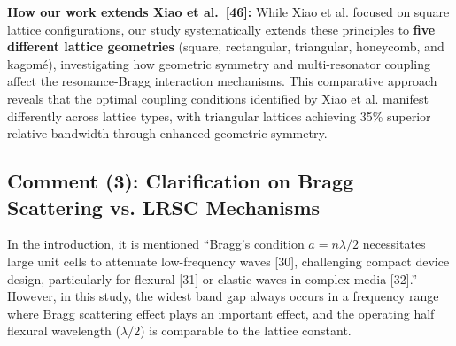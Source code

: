 \documentclass[11pt,a4paper]{article}
\newenvironment{reviewerbox}{%
    \par\medskip\noindent{\color{reviewercolor}\rule{\linewidth}{2pt}}\par
    \noindent{\color{reviewercolor}\bfseries Reviewer Comment}\par\smallskip
}{%
    \par\noindent{\color{reviewercolor}\rule{\linewidth}{0.5pt}}\medskip
}
\begin{document}
\textbf{How our work extends Xiao et al.~[46]:} While Xiao et al. focused on square lattice configurations, our study systematically extends these principles to \textbf{five different lattice geometries} (square, rectangular, triangular, honeycomb, and kagomé), investigating how geometric symmetry and multi-resonator coupling affect the resonance-Bragg interaction mechanisms. This comparative approach reveals that the optimal coupling conditions identified by Xiao et al. manifest differently across lattice types, with triangular lattices achieving 35\% superior relative bandwidth through enhanced geometric symmetry.

\newpage

\subsection*{Comment (3): Clarification on Bragg Scattering vs. LRSC Mechanisms}

\begin{reviewerbox}
In the introduction, it is mentioned ``Bragg's condition $a = n\lambda/2$ necessitates large unit cells to attenuate low-frequency waves [30], challenging compact device design, particularly for flexural [31] or elastic waves in complex media [32].'' However, in this study, the widest band gap always occurs in a frequency range where Bragg scattering effect plays an important effect, and the operating half flexural wavelength ($\lambda/2$) is comparable to the lattice constant.
\end{reviewerbox}
\end{document}
